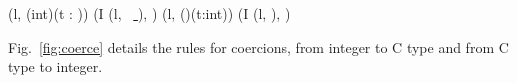 \begin{figure*}[bt]
  \scriptsize{
    {
      {
        (l, (int)(t : )) 
        (I \concat (l,
        \
        \underline{ \Zclear}
        \semicolon
        ), )
      }
    }
    {
      {(l, ()(t:int))  (I \concat (l,
        \underline{\Zinit {}}
        \semicolon
        ), )}
    }
  }
  \vspace{-4mm}
  \caption{Translation rules for coercions}
  \label{fig:coerce}
\vspace{-2mm}
\end{figure*}


Fig.~\ref{fig:coerce} details the rules for coercions, from integer to C type
and from C type to integer.


